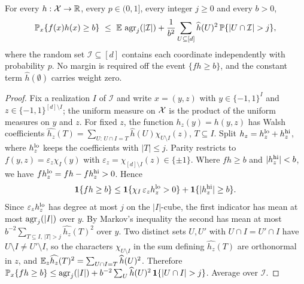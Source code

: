 \begin{lemma}\label{lem:restriction}
For every $h:\mathcal X\to\mathbb R$, every $p\in(0,1]$, every integer $j\ge0$ and every
$b>0$,
\begin{equation}\label{eq:restriction}
 \Pp_x\{f(x)h(x)\ge b\}\ \le\ \E\,\agr_j(|\mathcal I|)
 +\frac1{b^2}\sum_{U\subseteq[d]}\widehat h(U)^2\,\Pp\{|U\cap\mathcal I|>j\},
\end{equation}
where the random set $\mathcal I\subseteq[d]$ contains each coordinate
independently with probability $p$. No margin is required off the event
$\{fh\ge b\}$, and the constant term $\widehat h(\emptyset)$ carries weight
zero.
\end{lemma}
\begin{proof}
Fix a realization $I$ of $\mathcal I$ and write $x=(y,z)$ with
$y\in\{-1,1\}^I$ and $z\in\{-1,1\}^{[d]\setminus I}$; the uniform measure
on $\mathcal X$ is the product of the uniform measures on $y$ and $z$. For fixed
$z$, the function $h_z(y)=h(y,z)$ has Walsh coefficients
$\widehat{h_z}(T)=\sum_{U:\,U\cap I=T}\widehat h(U)\chi_{U\setminus I}(z)$,
$T\subseteq I$. Split $h_z=h_z^{\rm lo}+h_z^{\rm hi}$, where
$h_z^{\rm lo}$ keeps the coefficients with $|T|\le j$. Parity restricts to
$f(y,z)=\varepsilon_z\chi_I(y)$ with
$\varepsilon_z=\chi_{[d]\setminus I}(z)\in\{\pm1\}$. Where $fh\ge b$ and
$|h_z^{\rm hi}|<b$, we have $fh_z^{\rm lo}=fh-fh_z^{\rm hi}>0$. Hence
\[
 \mathbf 1\{fh\ge b\}\le\mathbf 1\{\chi_I\,\varepsilon_zh_z^{\rm lo}>0\}
 +\mathbf 1\{|h_z^{\rm hi}|\ge b\}.
\]
Since $\varepsilon_zh_z^{\rm lo}$ has degree at most $j$ on the
$|I|$-cube, the first indicator has mean at most $\operatorname{agr}_j(|I|)$ over $y$.
By Markov's inequality the second has mean at most
$b^{-2}\sum_{T\subseteq I,\,|T|>j}\widehat{h_z}(T)^2$ over $y$. Two
distinct sets $U,U'$ with $U\cap I=U'\cap I$ have
$U\setminus I\ne U'\setminus I$, so the characters $\chi_{U\setminus I}$
in the sum defining $\widehat{h_z}(T)$ are orthonormal in $z$, and
$\mathbb E_z\widehat{h_z}(T)^2=\sum_{U\cap I=T}\widehat h(U)^2$. Therefore
$\Pp_x\{fh\ge b\}\le\agr_j(|I|)+b^{-2}\sum_U\widehat h(U)^2\,
\mathbf 1\{|U\cap I|>j\}$. Average over $\mathcal I$.
\end{proof}

